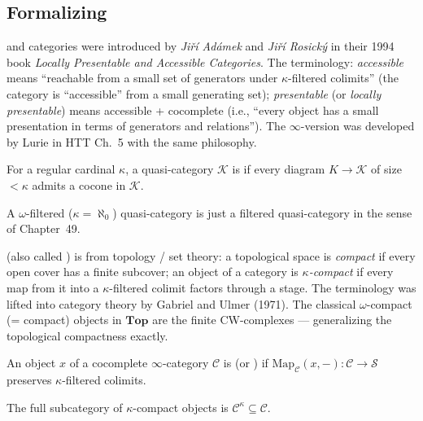\subsection{Formalizing}

\begin{nameorigin}
 and  categories were introduced by
\emph{Jiří Adámek} and \emph{Jiří Rosický} in their 1994 book
\emph{Locally Presentable and Accessible Categories}. The terminology:
\emph{accessible} means ``reachable from a small set of generators
under $\kappa$-filtered colimits'' (the category is ``accessible''
from a small generating set); \emph{presentable} (or \emph{locally
presentable}) means accessible + cocomplete (i.e., ``every object has
a small presentation in terms of generators and relations''). The
$\infty$-version was developed by Lurie in HTT Ch.~5 with the same
philosophy.
\end{nameorigin}

\begin{definition}
\label{def:kappa-filtered}
For a regular cardinal $\kappa$, a quasi-category $\mathcal{K}$ is
 if every diagram $K \to \mathcal{K}$ of size
$< \kappa$ admits a cocone in $\mathcal{K}$.

A $\omega$-filtered ($\kappa = \aleph_0$) quasi-category is just a
filtered quasi-category in the sense of Chapter~49.
\end{definition}

\begin{nameorigin}
 (also called ) is from
topology / set theory: a topological space is \emph{compact} if every
open cover has a finite subcover; an object of a category is \emph{$\kappa$-compact}
if every map from it into a $\kappa$-filtered colimit factors through a
stage. The terminology was lifted into category theory by Gabriel and
Ulmer (1971). The classical $\omega$-compact (= compact) objects in
$\mathbf{Top}$ are the finite CW-complexes — generalizing the
topological compactness exactly.
\end{nameorigin}

\begin{definition}
\label{def:kappa-compact}
An object $x$ of a cocomplete $\infty$-category $\mathcal{C}$ is
 (or ) if
$\mathrm{Map}_\mathcal{C}(x, -) : \mathcal{C} \to \mathcal{S}$ preserves
$\kappa$-filtered colimits.

The full subcategory of $\kappa$-compact objects is $\mathcal{C}^\kappa
\subseteq \mathcal{C}$.
\end{definition}

